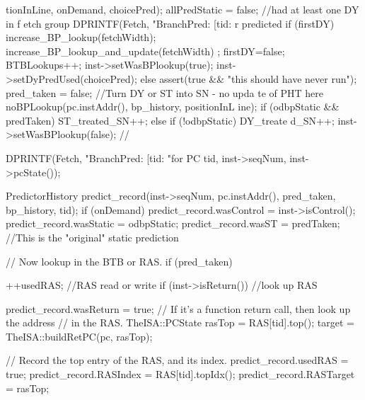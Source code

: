 \begin{DoxyCode}
{{{{      tionInLine, onDemand, choicePred);
                                allPredStatic = false; //had at least one DY in f
      etch group
                            DPRINTF(Fetch, "BranchPred: [tid:%
      r predicted %
                                if (firstDY) {
                                        increase_BP_lookup(fetchWidth);
                                        increase_BP_lookup_and_update(fetchWidth)
      ;
                                        firstDY=false;
                                }
                                BTBLookups++;
                                inst->setWasBPlookup(true);
                                inst->setDyPredUsed(choicePred);
                        } else {
                                assert(true && "this should have never run");
                            pred_taken = false; //Turn DY or ST into SN - no upda
      te of PHT here
                                noBPLookup(pc.instAddr(), bp_history, positionInL
      ine);
                                if (odbpStatic && predTaken)    ST_treated_SN++;
                                else if (!odbpStatic)                   DY_treate
      d_SN++;
                                inst->setWasBPlookup(false);
                        }
        }
    //}

    DPRINTF(Fetch, "BranchPred: [tid:%
                "for PC %
            tid, inst->seqNum, inst->pcState());

    PredictorHistory predict_record(inst->seqNum, pc.instAddr(),
                                    pred_taken, bp_history, tid);
        if (onDemand) {
                predict_record.wasControl = inst->isControl();
                predict_record.wasStatic = odbpStatic;
                predict_record.wasST = predTaken; //This is the "original" static
       prediction
        }

    // Now lookup in the BTB or RAS.
    if (pred_taken)
    {
        ++usedRAS; //RAS read or write
        if (inst->isReturn()) //look up RAS
        {
            predict_record.wasReturn = true;
            // If it's a function return call, then look up the address
            // in the RAS.
            TheISA::PCState rasTop = RAS[tid].top();
            target = TheISA::buildRetPC(pc, rasTop);

            // Record the top entry of the RAS, and its index.
            predict_record.usedRAS = true;
            predict_record.RASIndex = RAS[tid].topIdx();
            predict_record.RASTarget = rasTop;

}}}
\end{DoxyCode}
